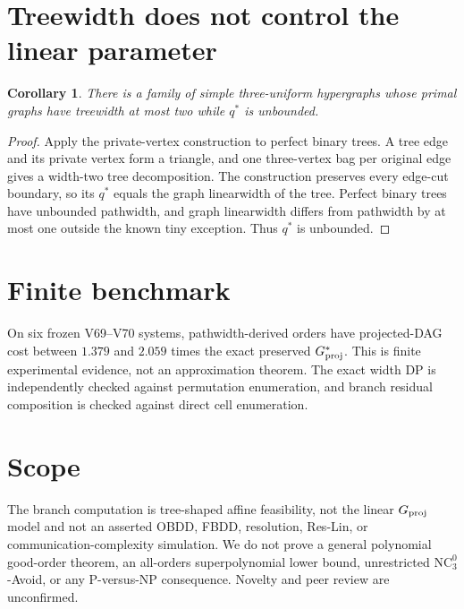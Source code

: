 \documentclass[11pt]{article}
\newtheorem{corollary}{Corollary}
\begin{document}
\section{Treewidth does not control the linear parameter}
\begin{corollary}
There is a family of simple three-uniform hypergraphs whose primal graphs have
treewidth at most two while $q^*$ is unbounded.
\end{corollary}

\begin{proof}
Apply the private-vertex construction to perfect binary trees.  A tree edge and
its private vertex form a triangle, and one three-vertex bag per original edge
gives a width-two tree decomposition.  The construction preserves every
edge-cut boundary, so its $q^*$ equals the graph linearwidth of the tree.
Perfect binary trees have unbounded pathwidth, and graph linearwidth differs
from pathwidth by at most one outside the known tiny exception.  Thus $q^*$ is
unbounded.
\end{proof}

\section{Finite benchmark}
On six frozen V69--V70 systems, pathwidth-derived orders have projected-DAG
cost between $1.379$ and $2.059$ times the exact preserved $G^*_{\rm proj}$.
This is finite experimental evidence, not an approximation theorem.  The exact
width DP is independently checked against permutation enumeration, and branch
residual composition is checked against direct cell enumeration.

\section{Scope}
The branch computation is tree-shaped affine feasibility, not the linear
$G_{\rm proj}$ model and not an asserted OBDD, FBDD, resolution, Res-Lin, or
communication-complexity simulation.  We do not prove a general polynomial
good-order theorem, an all-orders superpolynomial lower bound, unrestricted
$\mathrm{NC}^0_3$-Avoid, or any P-versus-NP consequence.  Novelty and peer
review are unconfirmed.
\end{document}
